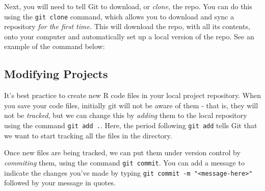 \documentclass[]{book}
\newenvironment{Shaded}{\begin{snugshade}}{\end{snugshade}}
\newcommand{\StringTok}[1]{\textcolor[rgb]{0.31,0.60,0.02}{#1}}
\newcommand{\OperatorTok}[1]{\textcolor[rgb]{0.81,0.36,0.00}{\textbf{#1}}}
\newcommand{\ErrorTok}[1]{\textcolor[rgb]{0.64,0.00,0.00}{\textbf{#1}}}
\newcommand{\NormalTok}[1]{#1}
\begin{document}
\begin{Shaded}
\end{Shaded}

Next, you will need to tell Git to download, or \emph{clone}, the repo.
You can do this using the \texttt{git\ clone} command, which allows you
to download and sync a repository \emph{for the first time.} This will
download the repo, with all its contents, onto your computer and
automatically set up a local version of the repo. See an example of the
command below:

\begin{Shaded}
\end{Shaded}

\subsection{Modifying Projects}\label{modifying-projects}

It's best practice to create new R code files in your local project
repository. When you save your code files, initially git will not be
aware of them - that is, they will not be \emph{tracked}, but we can
change this by \emph{adding} them to the local repository using the
command \texttt{git\ add\ .}. Here, the period following
\texttt{git\ add} tells Git that we want to start tracking all the files
in the directory.

\begin{Shaded}
\end{Shaded}

Once new files are being tracked, we can put them under version control
by \emph{commiting} them, using the command \texttt{git\ commit}. You
can add a message to indicate the changes you've made by typing
\texttt{git\ commit\ -m\ "\textless{}message-here\textgreater{}"}
followed by your message in quotes.
\end{document}
